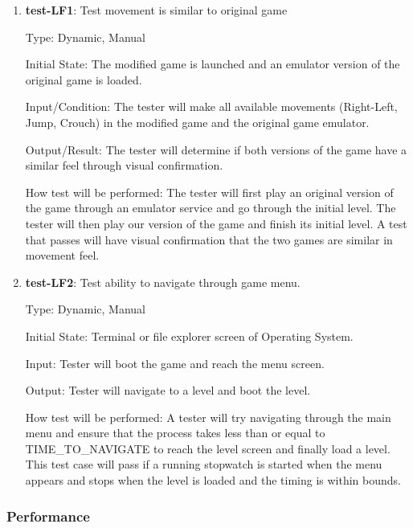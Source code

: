 \documentclass[12pt, titlepage]{article}
\begin{document}
\begin{enumerate}

\item{\textbf{test-LF1}: Test movement is similar to original game\\}

Type: Dynamic, Manual
					
Initial State: The modified game is launched and an emulator version of the original game is loaded.
					
Input/Condition: The tester will make all available movements (Right-Left, Jump, Crouch) in the modified game and the original game emulator.
					
Output/Result: The tester will determine if both versions of the game have a similar feel through visual confirmation.
					
How test will be performed: The tester will first play an original version of the game through an emulator service and go through the initial level. The tester will then play our version of the game and finish its initial level. A test that passes will have visual confirmation that the two games are similar in movement feel.
					
\item{\textbf{test-LF2}: Test ability to navigate through game menu.\\}

Type: Dynamic, Manual
					
Initial State: Terminal or file explorer screen of Operating System.
					
Input: Tester will boot the game and reach the menu screen.
					
Output: Tester will navigate to a level and boot the level.
					
How test will be performed: A tester will try navigating through the main menu and ensure that the process takes less than or equal to TIME\_TO\_NAVIGATE to reach the level screen and finally load a level. This test case will pass if a running stopwatch is started when the menu appears and stops when the level is loaded and the timing is within bounds.

\end{enumerate}

\subsubsection{Performance}
\end{document}
